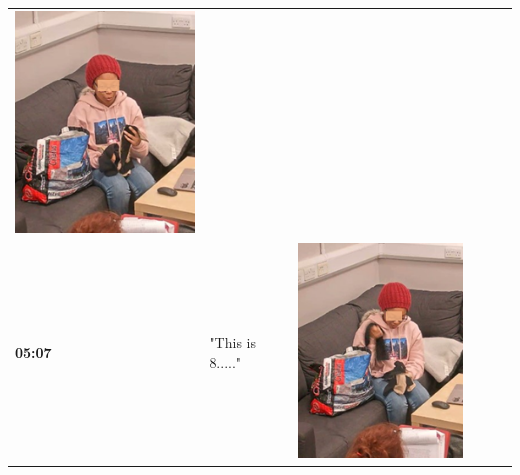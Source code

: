 \documentclass[twocolumn, serif, empirical, authordate]{jote-article}
\begin{document}
\begin{table}[ht!]
\begin{mdframed}[linecolor=jotedark]
\begin{tabularx}{\linewidth}{@{} m{.05\linewidth} m{.2\linewidth} >{\raggedleft\arraybackslash}m{.19\linewidth}  m{.05\linewidth} m{.2\linewidth} >{\raggedleft\arraybackslash}m{.19\linewidth} }
\includegraphics[height=.15\textheight, width=.8\linewidth]{media/image10.png}  \\
 \textbf{05:07} & "This is 8....." & \includegraphics[height=.15\textheight, width=.8\linewidth]{media/image6.png} &

\end{tabularx}
\end{mdframed}
\end{table}
\end{document}

